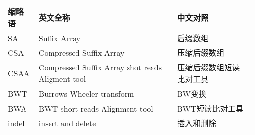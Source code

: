 \begin{abbreviation}\renewcommand{\arraystretch}{1.3}
\noindent
\begin{table}[ht]
\begin{tabular}{p{2cm}p{6cm}p{8cm}}
\textbf{缩略语}&\textbf{英文全称}&\textbf{中文对照}\\
SA &Suffix Array &后缀数组\\
CSA & Compressed Suffix Array &压缩后缀数组\\
CSAA & Compressed Suffix Array shot reads Aligment tool & 压缩后缀数组短读比对工具\\
BWT & Burrows-Wheeler transform&BW变换\\
BWA & BWT short reads Alignment tool & BWT短读比对工具\\
indel & insert and delete &插入和删除\\
\end{tabular}
\end{table}
\end{abbreviation}
